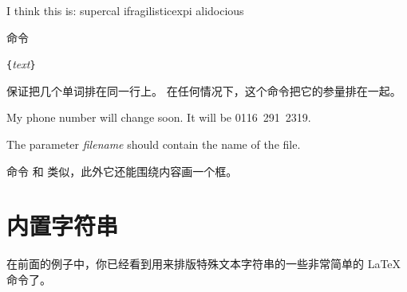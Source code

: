 \begin{example}
I think this is: su\-per\-cal\-%
i\-frag\-i\-lis\-tic\-ex\-pi\-%
al\-i\-do\-cious
\end{example}

命令
\begin{lscommand}
\verb|{|\emph{text}\verb|}|
\end{lscommand}
\noindent 保证把几个单词排在同一行上。
在任何情况下，这个命令把它的参量排在一起。

\begin{example}
My phone number will change soon.
It will be \mbox{0116 291 2319}.

The parameter
\mbox{\emph{filename}} should
contain the name of the file.
\end{example}

命令  和  类似，此外它还能围绕内容画一个框。


\section{内置字符串}

在前面的例子中，你已经看到用来排版特殊文本字符串的一些非常简单的 \LaTeX{} 命令了。

\vspace{2ex}

